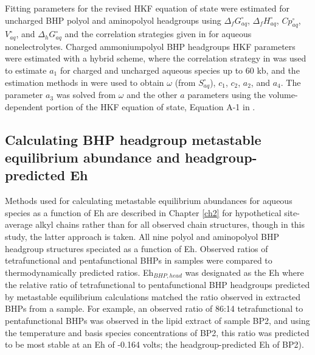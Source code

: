 Fitting parameters for the revised HKF equation of state were estimated for uncharged BHP polyol and aminopolyol headgroups using $\Delta_{f}G^{\circ}_{aq}$, $\Delta_{f}H^{\circ}_{aq}$, $Cp^{\circ}_{aq}$, $V^{\circ}_{aq}$, and $\Delta_{h}G^{\circ}_{aq}$ and the correlation strategies given in \cite{plyasunov2001correlation} for aqueous nonelectrolytes. Charged ammoniumpolyol BHP headgroups HKF parameters were estimated with a hybrid scheme, where the correlation strategy in \cite{sverjensky2014water} was used to estimate $a_{1}$ for charged and uncharged aqueous species up to 60 kb, and the estimation methods in \cite{shock1990calculation} were used to obtain $\omega$ (from $S^{\circ}_{aq}$), $c_{1}$, $c_{2}$, $a_{2}$, and $a_{4}$. The parameter $a_{3}$ was solved from $\omega$ and the other $a$ parameters using the volume-dependent portion of the HKF equation of state, Equation A-1 in \cite{tanger1988calculation}.

\subsection{Calculating BHP headgroup metastable equilibrium abundance and headgroup-predicted Eh}

Methods used for calculating metastable equilibrium abundances for aqueous species as a function of Eh are described in Chapter \ref{ch2} for hypothetical site-average alkyl chains rather than for all observed chain structures, though in this study, the latter approach is taken. All nine polyol and aminopolyol BHP headgroup structures speciated as a function of Eh. Observed ratios of tetrafunctional and pentafunctional BHPs in samples were compared to thermodynamically predicted ratios. Eh$_{BHP, head}$ was designated as the Eh where the relative ratio of tetrafunctional to pentafunctional BHP headgroups predicted by metastable equilibrium calculations matched the ratio observed in extracted BHPs from a sample. For example, an observed ratio of 86:14 tetrafunctional to pentafunctional BHPs was observed in the lipid extract of sample BP2, and using the temperature and basis species concentrations of BP2, this ratio was predicted to be most stable at an Eh of -0.164 volts; the headgroup-predicted Eh of BP2).



